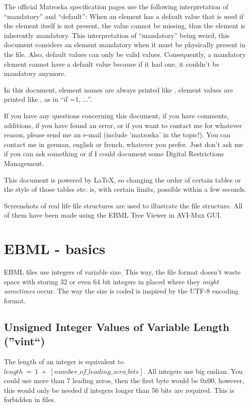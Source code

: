 \documentclass[12pt]{article}
\begin{document}
The official Matroska specification pages use the following interpretation of ``mandatory'' and ``default'': When an element has a default value that is used if the element itself is not present, the value cannot be missing, thus the element is inherently mandatory. This interpretation of ``mandatory'' being weird, this document considers an element mandatory when it must be physically present in the file. Also, default values can only be valid values. Consequently, a mandatory element cannot have a default value because if it had one, it couldn't be mandatory anymore.

In this document, element names are always printed like , element values are printed like , as in ``if =1, ...''. 

If you have any questions concerning this document, if you have comments, additions, if you have found an error, or if you want to contact me for whatever reason, please send me an e-mail (include 'matroska' in the topic!). You can contact me in german, english or french, whatever you prefer. Just don't ask me if you can ask something or if I could document some Digital Restrictions Management.

This document is powered by LaTeX, so changing the order of certain tables or the style of those tables etc. is, with certain limits, possible within a few seconds.

Screenshots of real life file structures are used to illustrate the file structure. All of them have been made using the EBML Tree Viewer in AVI-Mux GUI.
\newpage
\section{EBML - basics}
\normalsize
EBML files use integers of variable size. This way, the file format doesn't waste space with storing 32 or even 64 bit integers in placed where they \emph{might sometimes} occur. The way the size is coded is inspired by the UTF-8 encoding format.
\subsection{Unsigned Integer Values of Variable Length (''vint``)}
The length of an integer is equivalent to $length~=~1~+~[number\_of\_leading\_zero\_bits]$. All integers use big endian. You could use more than 7 leading zeros, then the first byte would be 0x00, however, this would only be needed if integers longer than 56 bits are required. This is forbidden in \Matroska files.
\end{document}
